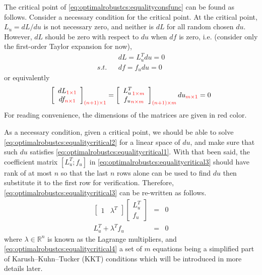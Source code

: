 The critical point of \eqref{eq:optimalrobustcs:equalityconsfunc} can be found as follows. Consider a necessary condition for the critical point. At the critical point, $L_u = dL / du$ is not necessary zero, and neither is $dL$ for all random chosen $du$. However, $dL$ should be zero with respect to $du$ when $df$ is zero, i.e. (consider only the first-order Taylor expansion for now),
\begin{eqnarray}
	&& dL = L_u^Tdu = 0 \label{eq:optimalrobustcs:equalitycritical1} \\
	\textit{s.t.} && df = f_udu = 0 \label{eq:optimalrobustcs:equalitycritical2}
\end{eqnarray}
or equivalently
\begin{eqnarray}
	\left[\begin{array}{c}
		dL_{\color{red} 1\times 1} \\ df_{\color{red} n\times 1}
	\end{array}\right]_{\color{red} (n+1)\times 1} = \left[\begin{array}{c}
	{L_u^T}_{\color{red} 1\times m} \\ {f_u}_{\color{red} n\times m}
	\end{array}\right]_{\color{red} (n+1)\times m}du_{\color{red} m\times 1} = 0 \label{eq:optimalrobustcs:equalitycritical3}
\end{eqnarray}
For reading convenience, the dimensions of the matrices are given in red color.

As a necessary condition, given a critical point, we should be able to solve \eqref{eq:optimalrobustcs:equalitycritical2} for a linear space of $du$, and make sure that such $du$ satisfies \eqref{eq:optimalrobustcs:equalitycritical1}. With that been said, the coefficient matrix $[L_u^T; f_u]$ in \eqref{eq:optimalrobustcs:equalitycritical3} should have rank of at most $n$ so that the last $n$ rows alone can be used to find $du$ then substitute it to the first row for verification. Therefore, \eqref{eq:optimalrobustcs:equalitycritical3} can be re-written as follows.
\begin{eqnarray}
	\left[\begin{array}{cc}
		1 & \lambda^T
	\end{array}\right] \left[\begin{array}{c}
	L_u^T \\ f_u
	\end{array}\right] &=& 0 \nonumber \\
	L_u^T + \lambda^Tf_u &=& 0 \label{eq:optimalrobustcs:equalitycritical4}
\end{eqnarray}
where $\lambda \in \mathbb{R}^n$ is known as the Lagrange multipliers, and \eqref{eq:optimalrobustcs:equalitycritical4} a set of $m$ equations being a simplified part of Karush–Kuhn–Tucker (KKT) conditions which will be introduced in more details later.


